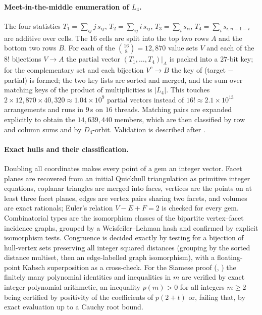 \paragraph{Meet-in-the-middle enumeration of $L_4$.}
The four statistics $T_1=\sum_{ij}j\,s_{ij}$, $T_2=\sum_{ij}i\,s_{ij}$, $T_3=\sum_i s_{ii}$, $T_4=\sum_i s_{i,n-1-i}$ are additive over cells.
The $16$ cells are split into the top two rows $A$ and the bottom two rows $B$.
For each of the $\binom{16}{8}=12{,}870$ value sets $V$ and each of the $8!$ bijections $V\to A$ the partial vector $(T_1,\dots,T_4)|_A$ is packed into a $27$-bit key; for the complementary set and each bijection $V^c\to B$ the key of (target $-$ partial) is formed; the two key lists are sorted and merged, and the sum over matching keys of the product of multiplicities is $|L_4|$.
This touches $2\times12{,}870\times40{,}320\approx1.04\times10^9$ partial vectors instead of $16!\approx2.1\times10^{13}$ arrangements and runs in $9$\,s on $16$ threads.
Matching pairs are expanded explicitly to obtain the $14{,}639{,}440$ members, which are then classified by row and column sums and by $D_4$-orbit.
Validation is described after .

\paragraph{Exact hulls and their classification.}
Doubling all coordinates makes every point of a gem an integer vector.
Facet planes are recovered from an initial Quickhull triangulation as primitive integer equations, coplanar triangles are merged into faces, vertices are the points on at least three facet planes, edges are vertex pairs sharing two facets, and volumes are exact rationals; Euler's relation $V-E+F=2$ is checked for every gem.
Combinatorial types are the isomorphism classes of the bipartite vertex--facet incidence graphs, grouped by a Weisfeiler--Lehman hash and confirmed by explicit isomorphism tests.
Congruence is decided exactly by testing for a bijection of hull-vertex sets preserving all integer squared distances (grouping by the sorted distance multiset, then an edge-labelled graph isomorphism), with a floating-point Kabsch superposition as a cross-check.
For the Siamese proof (, ) the finitely many polynomial identities and inequalities in $m$ are verified by exact integer polynomial arithmetic, an inequality $p(m)>0$ for all integers $m\ge2$ being certified by positivity of the coefficients of $p(2+t)$ or, failing that, by exact evaluation up to a Cauchy root bound.

